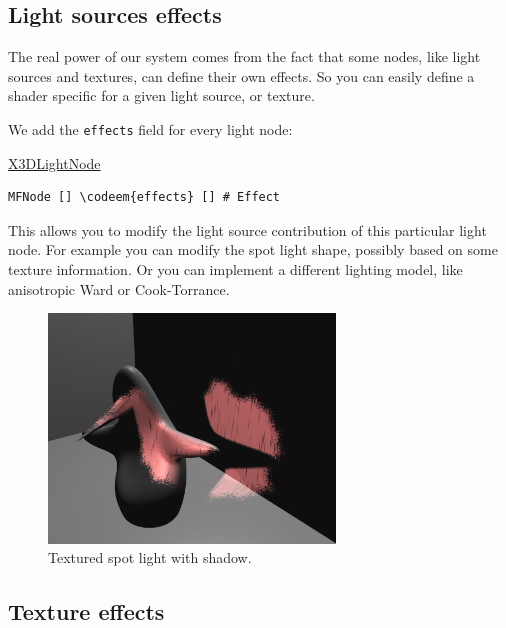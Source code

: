 \documentclass{acmsiggraph}                     %
\newenvironment{mycode}
{\begin{mycodecore}}
{\end{mycodecore}
\vspace{-0.1in}}
\newcommand*{\codeem}[1]{\textbf{#1}}
\begin{document}
\subsection{Light sources effects}

The real power of our system comes from the fact that some nodes,
like light sources and textures, can define their own effects.
So you can easily define a shader specific for a given light source,
or texture.

\needspace{1in}
We add the \texttt{effects} field for every light node:

\begin{mycode}
\underline{X3DLightNode}
\begin{Verbatim}[commandchars=\\\{\}]
MFNode [] \codeem{effects} [] # Effect
\end{Verbatim}
\end{mycode}

This allows you to modify the light source contribution of this particular
light node. For example you can modify the spot light shape, possibly
based on some texture information.
Or you can implement a different lighting model, like anisotropic Ward
or Cook-Torrance.

\begin{figure}[H]
  \centering
  \includegraphics[width=3in]{fancy_light_spot_shape}
  \caption{Textured spot light with shadow.}
\end{figure}


\subsection{Texture effects}
\end{document}
